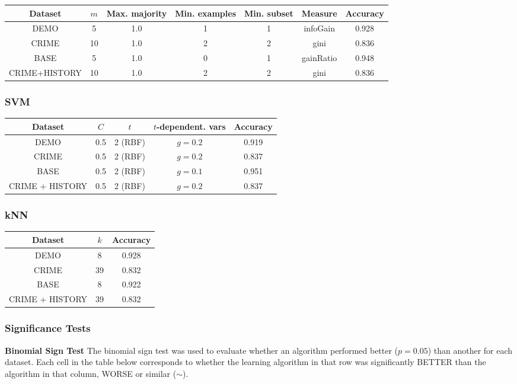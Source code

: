 \documentclass[11pt,letter]{article}
\begin{document}
\begin{tabular}{|c|c|c|c|c|c|c|}
\hline
Dataset & $m$ & Max. majority & Min. examples & Min. subset & Measure & Accuracy \\
\hline
DEMO & 5 & 1.0 & 1 & 1 & infoGain & 0.928 \\
CRIME & 10 & 1.0 & 2 & 2 & gini & 0.836 \\
BASE & 5 & 1.0 & 0 & 1 & gainRatio & 0.948 \\
CRIME+HISTORY & 10 & 1.0 & 2 & 2 & gini & 0.836 \\
\hline
\end{tabular}

\subsubsection{SVM}
\begin{tabular}{|c|c|c|c|c|}
\hline
Dataset & $C$ & $t$ & $t$-dependent. vars & Accuracy \\
\hline
DEMO 	& 0.5 & 2 (RBF) & $g=0.2$ & 0.919 \\
CRIME 	& 0.5 & 2 (RBF) & $g=0.2$ & 0.837 \\
BASE 	& 0.5 & 2 (RBF) & $g=0.1$ & 0.951 \\
CRIME + HISTORY & 0.5 & 2 (RBF) & $g=0.2$ & 0.837 \\
\hline
\end{tabular}

\subsubsection{kNN}
\begin{tabular}{|c|c|c|}
\hline
Dataset & $k$ & Accuracy \\
\hline
DEMO & 8 & 0.928 \\
CRIME & 39 & 0.832 \\
BASE & 8 & 0.922 \\
CRIME + HISTORY & 39 & 0.832 \\
\hline
\end{tabular}


\subsubsection{Significance Tests}

\textbf{Binomial Sign Test}
The binomial sign test was used to evaluate whether an algorithm performed better ($p=0.05$) than another for each dataset. Each cell in the table below corresponds to whether the learning algorithm in that row was significantly BETTER than the algorithm in that column, WORSE or similar ($\sim$).
\end{document}
